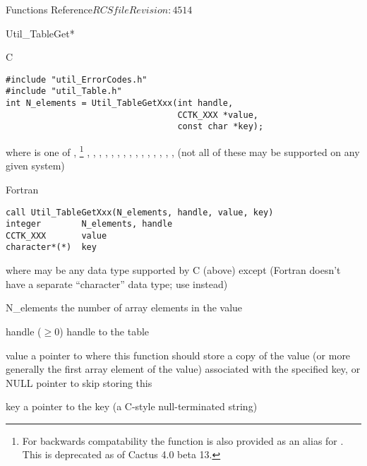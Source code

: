 \begin{cactuspart}{ Functions Reference}{$RCSfile$}{$Revision: 4514 $}
\begin{FunctionDescription}{Util\_TableGet*}
\begin{SynopsisSection}
\begin{Synopsis}{C}
\begin{verbatim}
#include "util_ErrorCodes.h"
#include "util_Table.h"
int N_elements = Util_TableGetXxx(int handle,
                                  CCTK_XXX *value,
                                  const char *key);
\end{verbatim}
where  is one of
   , %
\footnote{%
	 For backwards compatability the function
	  is also provided
	 as an alias for .
	 This is deprecated as of Cactus 4.0 beta 13.
	 }%
,
   , ,
   , , , , ,
   , , , ,
   , , , 
(not all of these may be supported on any given system)
\end{Synopsis}
\begin{Synopsis}{Fortran}
\begin{verbatim}
call Util_TableGetXxx(N_elements, handle, value, key)
integer        N_elements, handle
CCTK_XXX       value
character*(*)  key
\end{verbatim}
where  may be any data type supported by C (above)
except  (Fortran doesn't have a separate ``character''
data type; use  instead)
\end{Synopsis}
\end{SynopsisSection}

\begin{ResultSection}
\begin{Result}{N\_elements}
the number of array elements in the value
\end{Result}
\end{ResultSection}

\begin{ParameterSection}
\begin{Parameter}{handle ($\ge 0$)}
handle to the table
\end{Parameter}
\begin{Parameter}{value}
a pointer to where this function should store a copy of the value
(or more generally the first array element of the value) associated
with the specified key,
or NULL pointer to skip storing this
\end{Parameter}
\begin{Parameter}{key}
a pointer to the key (a C-style null-terminated string)
\end{Parameter}
\end{ParameterSection}


\end{FunctionDescription}
\end{cactuspart}
